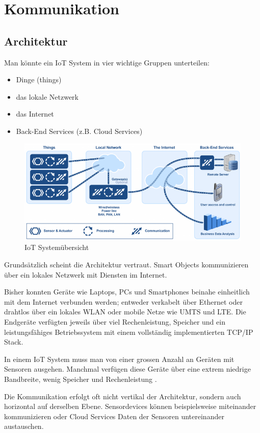 \chapter{Kommunikation}
\section{Architektur}
Man könnte ein IoT System in vier wichtige Gruppen unterteilen: \cite{IoTNetworks}
\begin{itemize}
\item Dinge (things)
\item das lokale Netzwerk
\item das Internet
\item Back-End Services (z.B. Cloud Services)
\end{itemize}
\begin{figure}[H]
\centering
\includegraphics[scale=0.8]{../02_Analyse/images/iot_system_overview_by_micrium.png}
\caption{IoT Systemübersicht\cite{IoTOverview}}
\end{figure}
Grundsätzlich scheint die Architektur vertraut. Smart Objects kommunizieren über ein lokales Netzwerk mit Diensten im Internet.

Bisher konnten Geräte wie Laptops, PCs und Smartphones beinahe einheitlich mit dem Internet verbunden werden; entweder verkabelt über Ethernet oder drahtlos über ein lokales WLAN oder mobile Netze wie UMTS und LTE. Die Endgeräte verfügten jeweils über viel Rechenleistung, Speicher und ein leistungsfähiges Betriebssystem mit einem vollständig implementierten TCP/IP Stack. 

In einem IoT System muss man von einer grossen Anzahl an Geräten mit Sensoren ausgehen. Manchmal verfügen diese Geräte über eine extrem niedrige Bandbreite, wenig Speicher und Rechenleistung \cite{CiscoIoTArchitecture}.

Die Kommunikation erfolgt oft nicht vertikal der Architektur, sondern auch horizontal auf derselben Ebene. Sensordevices können beispielsweise miteinander kommunizieren oder Cloud Services Daten der Sensoren untereinander austauschen.
